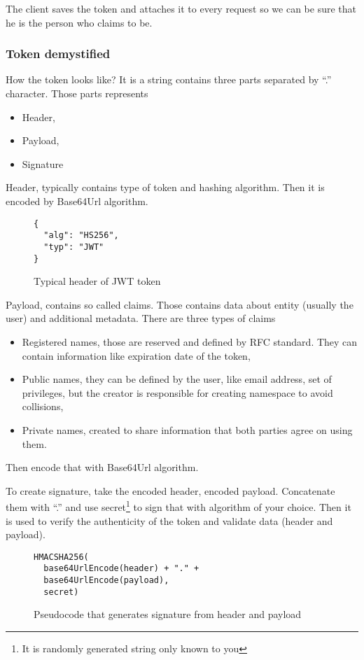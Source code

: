 The client saves the token and attaches it to every request so we can be sure that he is the person who claims to be.

\subsubsection{Token demystified}
How the token looks like? It is a string contains three parts separated by ``.'' character\cite{JWT-introduction}. Those parts represents
\begin{itemize}
\item Header,
\item Payload,
\item Signature
\end{itemize}

Header, typically contains type of token and hashing algorithm. Then it is encoded by Base64Url algorithm.
\begin{figure}[!htbp]
\begin{verbatim}
{
  "alg": "HS256",
  "typ": "JWT"
}
\end{verbatim}
\caption{Typical header of JWT token}
\label{src:typical-header}
\end{figure}

Payload, contains so called claims. Those contains data about entity (usually the user) and additional metadata. There are three types of claims
\begin{itemize}
\item Registered names, those are reserved and defined by RFC standard. They can contain information like expiration date of the token\cite{JWT-rfc},
\item Public names, they can be defined by the user, like email address, set of privileges, but the creator is responsible for creating namespace to avoid collisions,
\item Private names, created to share information that both parties agree on using them.
\end{itemize}
Then encode that with Base64Url algorithm.

To create signature, take the encoded header, encoded payload. Concatenate them with ``.'' and use secret\footnote{It is randomly generated string only known to you} to sign that with algorithm of your choice. Then it is used to verify the authenticity of the token and validate data (header and payload).

\begin{figure}[!htbp]
\begin{verbatim}
HMACSHA256(
  base64UrlEncode(header) + "." +
  base64UrlEncode(payload),
  secret)
\end{verbatim}
\caption{Pseudocode that generates signature from header and payload}
\label{src:signature}
\end{figure}

